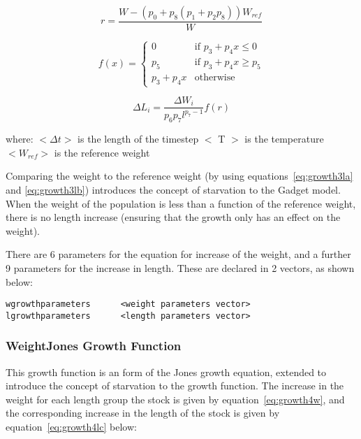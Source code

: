 \documentclass [a4paper, 10pt]{book}
\begin{document}
\begin{equation}\label{eq:growth3la}
 r = \frac{W - \left( p_{0} + p_{8} \left( p_{1} + p_{2}p_{8} \right) \right) W_{ref}}{W}
\end{equation}

\begin{equation}\label{eq:growth3lb}
f(x) =
\begin{cases}
  0
  & \textrm{if $p_{3} + p_{4}x \leq 0$} \\
  p_{5}
  & \textrm{if $p_{3} + p_{4}x \geq p_{5}$} \\
  p_{3} + p_{4}x
  & \textrm{otherwise}
\end{cases}
\end{equation}

\begin{equation}\label{eq:growth3lc}
\Delta L_{i} = \frac{\Delta W_{i}} {p_{6} p_{7} l^{p_{7} - 1}} f(r)
\end{equation}

where:\newline
$<\Delta t>$ is the length of the timestep\newline
$<$ T $>$ is the temperature\newline
$<W_{ref}>$ is the reference weight

\bigskip
Comparing the weight to the reference weight (by using equations~\ref{eq:growth3la} and \ref{eq:growth3lb}) introduces the concept of starvation to the Gadget model.  When the weight of the population is less than a function of the reference weight, there is no length increase (ensuring that the growth only has an effect on the weight).

\bigskip
There are 6 parameters for the equation for increase of the weight, and a further 9 parameters for the increase in length.  These are declared in 2 vectors, as shown below:

{\small\begin{verbatim}
wgrowthparameters      <weight parameters vector>
lgrowthparameters      <length parameters vector>
\end{verbatim}}

\subsubsection{WeightJones Growth Function}\label{subsec:growth4}
This growth function is an form of the Jones growth equation\footnotemark, extended to introduce the concept of starvation to the growth function.  The increase in the weight for each length group the stock is given by equation~\ref{eq:growth4w}, and the corresponding increase in the length of the stock is given by equation~\ref{eq:growth4lc} below:
\end{document}
